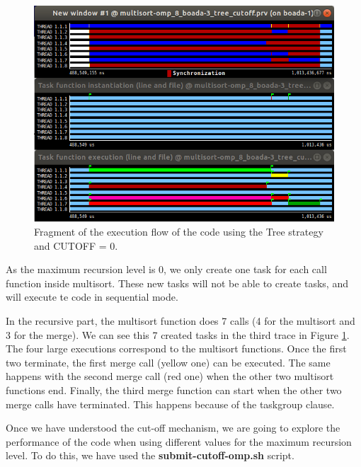 \documentclass[12pt, a4paper]{article}
\begin{document}
\begin{figure}[H]
	\centering
	\includegraphics[scale=0.45]{./images/S2/Tree_CUTOFF_paraver}
	
	\label{fig:trace_cutoff_tree}
	\caption{Fragment of the execution flow of the code using the Tree strategy and CUTOFF = 0.}
\end{figure}

As the maximum recursion level is 0, we only create one task for each call function inside multisort. These new tasks will not be able to create tasks, and will execute te code in sequential mode.

In the recursive part, the multisort function does 7 calls (4 for the multisort and 3 for the merge). We can see this 7 created tasks in the third trace in Figure \ref{fig:trace_cutoff_tree}. The four large executions correspond to the multisort functions. Once the first two terminate, the first merge call (yellow one) can be executed. The same happens with the second merge call (red one) when the other two multisort functions end. Finally, the third merge function can start when the other two merge calls have terminated. This happens because of the taskgroup clause.

Once we have understood the cut-off mechanism, we are going to explore the performance of the code when using different values for the maximum recursion level. To do this, we have used the \textbf{submit-cutoff-omp.sh} script.
\end{document}
